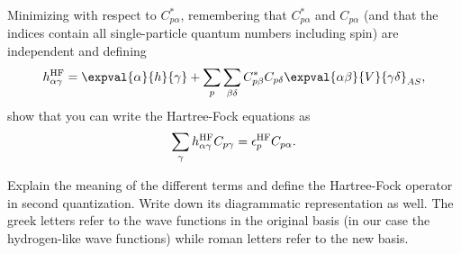 Minimizing with respect to $C^*_{p\alpha}$, remembering that $C^*_{p\alpha}$ and $C_{p\alpha}$ (and that the indices contain all single-particle quantum numbers including spin) are independent and defining
\begin{equation*}
    h_{\alpha\gamma}^\HF = \expval{\alpha}{h}{\gamma} + \sum_{p} \sum_{\beta\delta} C^*_{p\beta} C_{p\delta} \expval{\alpha\beta}{V}{\gamma\delta}_{AS},
\end{equation*}
show that you can write the Hartree-Fock equations as
\begin{equation*}
    \sum_{\gamma} h_{\alpha\gamma}^{\mathrm{HF}} C_{p\gamma} = \epsilon_p^{\mathrm{HF}} C_{p\alpha}. \label{eq:newhf}
\end{equation*}

Explain the meaning of the different terms and define the Hartree-Fock operator in second quantization.
Write down its diagrammatic representation as well.
The greek letters refer to the wave functions in the original basis (in our case the hydrogen-like wave functions) while roman letters refer to the new basis.

